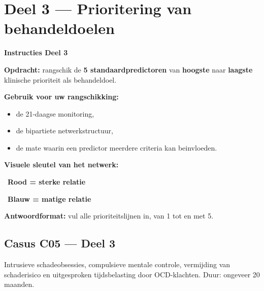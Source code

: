 \documentclass[11pt,a4paper]{article}
\begin{document}
\vspace{0.6em}
\newpage


\section{Deel 3 --- Prioritering van behandeldoelen}

\begin{tcolorbox}[colback=yellow!5,colframe=GoldAmber,arc=2.5mm,boxrule=0.9pt,
  left=10pt,right=10pt,top=9pt,bottom=9pt]
\textbf{\color{GoldAmber}Instructies Deel 3}

\smallskip\small
\textbf{Opdracht:} rangschik de \textbf{5 standaardpredictoren} van \textbf{hoogste} naar \textbf{laagste}
klinische prioriteit als behandeldoel.

\textbf{Gebruik voor uw rangschikking:}
\begin{itemize}[topsep=2pt,itemsep=1pt]
\item de 21-daagse monitoring,
\item de bipartiete netwerkstructuur,
\item de mate waarin een predictor meerdere criteria kan beinvloeden.
\end{itemize}

\textbf{Visuele sleutel van het netwerk:}
\begin{center}
~\textbf{Rood = sterke relatie}\qquad
{}~\textbf{Blauw = matige relatie}
\end{center}

\textbf{Antwoordformat:} vul alle prioriteitslijnen in, van 1 tot en met 5.
\end{tcolorbox}

\vspace{0.5em}
\subsection*{Casus C05 --- Deel 3}

\begin{complaintbox}[title={Casus C05 --- 25-jarige postgraduaatsstudent}]
\small Intrusieve schadeobsessies, compulsieve mentale controle, vermijding van schaderisico en uitgesproken tijdsbelasting door OCD-klachten. Duur: ongeveer 20 maanden.
\end{complaintbox}
\end{document}
